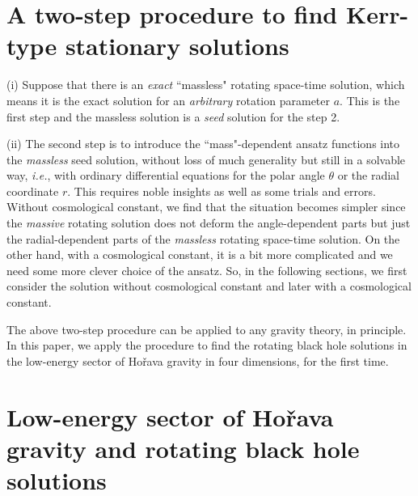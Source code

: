 \documentclass[preprint,aps,tightenlines,showkeys,nofootinbib,superscriptaddress]{revtex4}
\begin{document}
\section{A two-step procedure to find Kerr-type stationary solutions}

(i) Suppose that there is an {\it exact} ``massless" rotating space-time solution, which means it is the exact solution for an {\it arbitrary} rotation parameter $a$. This is the first step and the massless solution is a {\it seed} solution for the step 2.

(ii) The second step is to introduce the ``mass"-dependent ansatz functions into the {\it massless} seed solution,
without loss of much generality but still in a solvable way, {\it i.e.}, with
ordinary differential equations for the polar angle $\theta$ or the radial coordinate $r$. This requires noble insights as well as some trials and errors. Without cosmological constant, we find that the situation becomes simpler since the
{\it massive} rotating solution does not deform the angle-dependent parts but just
the radial-dependent parts
of the {\it massless} rotating space-time solution. On the other hand, with a cosmological constant, it is a bit more complicated and we need some more clever choice of the ansatz. So, in the following sections, we first consider the solution without cosmological constant and later with a cosmological constant.

The above two-step procedure can be applied to any gravity theory, in principle. In this paper, we apply the procedure to find the rotating black hole solutions in the low-energy sector of Ho\v{r}ava gravity in four dimensions, for the first time.

\section{Low-energy sector of Ho\v{r}ava gravity and rotating black hole solutions }
\end{document}
